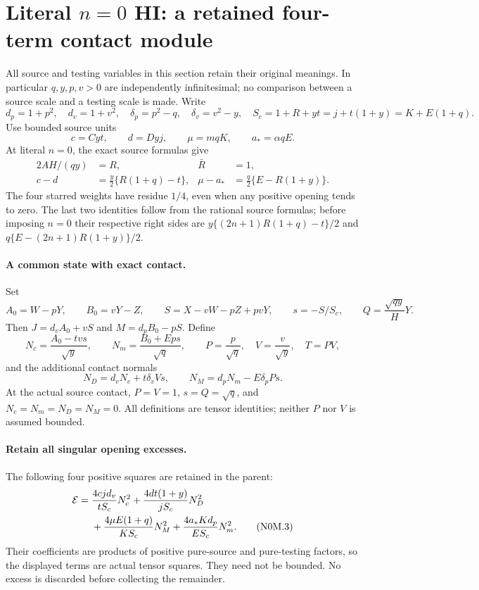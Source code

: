 \section{Literal \texorpdfstring{$n=0$}{n=0} HI: a retained four-term contact module}
\label{sec:r7-hi-n0-retained}
All source and testing variables in this section retain their original
meanings. In particular $q,y,p,v>0$ are independently infinitesimal;
no comparison between a source scale and a testing scale is made.
Write
\[
 d_p=1+p^2,\quad d_v=1+v^2,\quad
 \delta_p=p^2-q,\quad\delta_v=v^2-y,\quad
 S_c=1+R+yt=j+t(1+y)=K+E(1+q).
\]
Use bounded source units
\[
 c=Cyt,\qquad d=Dyj,\qquad \mu=mqK,\qquad a_*=\alpha qE.
\]
At literal $n=0$, the exact source formulas give
\begin{align}
 2AH/(qy)&=R, & \bar R&=1,\\
 c-d&=\frac y2\{R(1+q)-t\},&
 \mu-a_*&=\frac q2\{E-R(1+y)\}.                 \tag{N0M.1}
\end{align}
The four starred weights have residue $1/4$, even when any positive
opening tends to zero. The last two identities follow from the rational
source formulas; before imposing $n=0$ their respective right sides are
$y\{(2n+1)R(1+q)-t\}/2$ and
$q\{E-(2n+1)R(1+y)\}/2$.

\paragraph{A common state with exact contact.}
Set
\[
 A_0=W-pY,\qquad B_0=vY-Z,\qquad
 S=X-vW-pZ+pvY,\qquad s=-S/S_c,
 \qquad Q=\frac{\sqrt{qy}}H Y.
\]
Then $J=d_vA_0+vS$ and $M=d_pB_0-pS$. Define
\[
 N_c=\frac{A_0-tv s}{\sqrt y},\qquad
 N_m=\frac{B_0+Ep s}{\sqrt q},\qquad
 P=\frac p{\sqrt q},\quad V=\frac v{\sqrt y},\quad T=PV,
\]
and the additional contact normals
\[
 N_D=d_vN_c+t\delta_vVs,\qquad
 N_M=d_pN_m-E\delta_pPs.                         \tag{N0M.2}
\]
At the actual source contact, $P=V=1$, $s=Q=\sqrt q$, and
$N_c=N_m=N_D=N_M=0$. All definitions are tensor identities; neither
$P$ nor $V$ is assumed bounded.

\paragraph{Retain all singular opening excesses.}
The following four positive squares are retained in the parent:
\begin{align}
 \mathcal E={}&\frac{4cj d_v}{tS_c}N_c^2
 +\frac{4dt(1+y)}{jS_c}N_D^2\notag\\
 &+\frac{4\mu E(1+q)}{KS_c}N_M^2
 +\frac{4a_*K d_p}{ES_c}N_m^2.                 \tag{N0M.3}
\end{align}
Their coefficients are products of positive pure-source and pure-testing
factors, so the displayed terms are actual tensor squares. They need
not be bounded. No excess is discarded before collecting the remainder.

